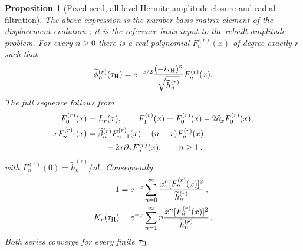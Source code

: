 \documentclass[a4paper,11pt]{article}
\def\ii{i}%
\def\ee{e}%
\newtheorem{proposition}{Proposition}[section]
\theoremstyle{definition}
\theoremstyle{remark}
\newcommand{\ii}{\mathrm i}
\newcommand{\ee}{\mathrm e}
\newcommand{\tphi}{\widetilde\phi}
\newcommand{\thh}{\widetilde h}
\begin{document}
\begin{proposition}[Fixed-seed, all-level Hermite amplitude closure and radial filtration]
The above expression is the number-basis matrix element of the
displacement evolution \cite{Perelomov1986}; it is the reference-basis input to the rebuilt
amplitude problem.
For every $n\ge0$ there is a real polynomial $F_n^{(r)}(x)$ of degree exactly $r$ such that
\begin{equation}
   \tphi_n^{(r)}(\tau_{\rm H})
   =\ee^{-x/2}\frac{(-\ii\tau_{\rm H})^n}{\sqrt{\thh_n^{(r)}}}
      F_n^{(r)}(x).
   \label{eq:Hermite-scalar-amplitude-app}
\end{equation}
The full sequence follows from
\begin{equation}
\begin{aligned}
   F_0^{(r)}(x)&=L_r(x),\qquad
   F_1^{(r)}(x)=F_0^{(r)}(x)-2\partial_xF_0^{(r)}(x),\\
   xF_{n+1}^{(r)}(x)
   &=\widetilde\beta_n^{(r)}F_{n-1}^{(r)}(x)
     -(n-x)F_n^{(r)}(x)\\
   &\hspace{2.2em}-2x\partial_xF_n^{(r)}(x),
   \qquad n\ge1\,,
   \label{eq:Hermite-F-recurrence-app}
\end{aligned}
\end{equation}
with $F_n^{(r)}(0)=\thh_n^{(r)}/n!$.  Consequently
\begin{equation}
\begin{aligned}
   1&=\ee^{-x}\sum_{n=0}^{\infty}
      \frac{x^n[F_n^{(r)}(x)]^2}{\thh_n^{(r)}}\,,\\
   K_r(\tau_{\rm H})
   &=\ee^{-x}\sum_{n=1}^{\infty}
      n\frac{x^n[F_n^{(r)}(x)]^2}{\thh_n^{(r)}}\,.
   \label{eq:Hermite-all-r-complexity-app}
\end{aligned}
\end{equation}
Both series converge for every finite $\tau_{\rm H}$.


\end{proposition}
\end{document}
